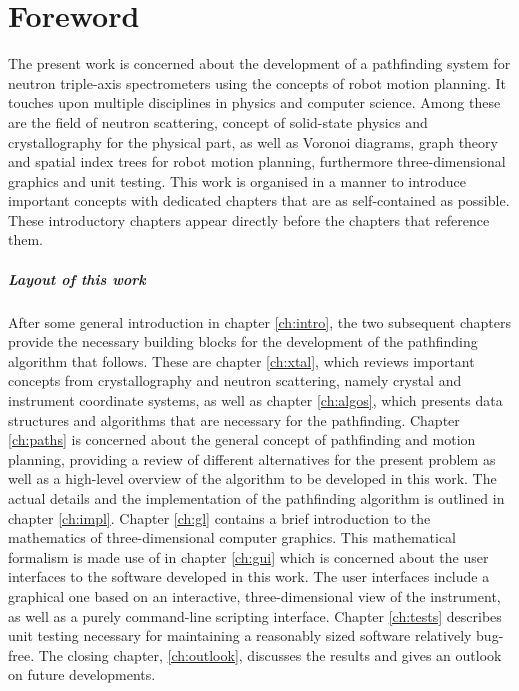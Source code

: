 %
%

\chapter*{Foreword}
The present work is concerned about the development of a pathfinding system for neutron triple-axis
spectrometers using the concepts of robot motion planning.
It touches upon multiple disciplines in physics and computer science. Among these are the field
of neutron scattering, concept of solid-state physics and crystallography for the physical part,
as well as Voronoi diagrams, graph theory and spatial index trees for robot motion 
planning, furthermore three-dimensional graphics and unit testing.
This work is organised in a manner to introduce important concepts with dedicated chapters that are
as self-contained as possible. These introductory chapters appear directly before the chapters that reference
them.

\paragraph{Layout of this work}
After some general introduction in chapter \ref{ch:intro}, the two subsequent chapters 
provide the necessary building blocks for the development of the pathfinding algorithm that follows.
These are chapter \ref{ch:xtal}, which reviews important concepts from crystallography and
neutron scattering, namely crystal and instrument coordinate systems,
as well as chapter \ref{ch:algos}, which presents data structures and algorithms 
that are necessary for the pathfinding.
Chapter \ref{ch:paths} is concerned about the general concept of pathfinding and motion planning, providing
a review of different alternatives for the present problem as well as a high-level overview of the algorithm
to be developed in this work. The actual details and the implementation of the pathfinding algorithm
is outlined in chapter \ref{ch:impl}.
Chapter \ref{ch:gl} contains a brief introduction to the mathematics of three-dimensional computer graphics.
This mathematical formalism is made use of in chapter \ref{ch:gui} which is concerned about the user interfaces to the software
developed in this work. The user interfaces include a graphical one based on an interactive, three-dimensional
view of the instrument, as well as a purely command-line scripting interface.
Chapter \ref{ch:tests} describes unit testing necessary for maintaining
a reasonably sized software relatively bug-free.
The closing chapter, \ref{ch:outlook}, discusses the results and gives an outlook 
on future developments.


